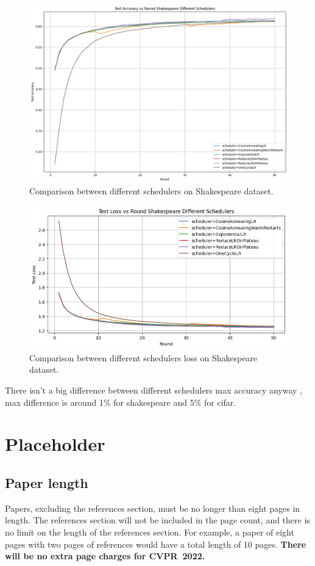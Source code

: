 \documentclass[10pt,twocolumn,letterpaper]{article}
\def\confName{CVPR}
\def\confYear{2022}
\begin{document}
\begin{figure}[h]
\centering
\includegraphics[width=\linewidth]{images/graph_shakespeare.png}
\caption{Comparison between different schedulers on Shakespeare dataset.}
\label{fig:short-b}
\end{figure}



\begin{figure}[h]
\centering
\includegraphics[width=\linewidth]{images/shakespeare_loss.png}
\caption{Comparison between different schedulers loss on Shakespeare dataset.}
\label{fig:short-b}
\end{figure}
There isn't a big difference between different schedulers max accuracy anyway , max difference is around 1\% for shakespeare and 5\% for cifar.
\section{Placeholder}
\subsection{Paper length}
Papers, excluding the references section, must be no longer than eight pages in length.
The references section will not be included in the page count, and there is no limit on the length of the references section.
For example, a paper of eight pages with two pages of references would have a total length of 10 pages.
{\bf There will be no extra page charges for \confName\ \confYear.}
\end{document}
